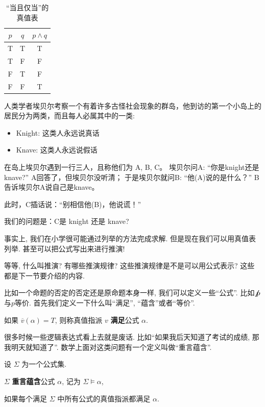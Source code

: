 \begin{table}
	\centering
	\begin{tabular}{|c|c|c|}
		\hline
		$p$ & $q$ & $p\land q$ \\ 
		\hline
		T & T & T\\ 
		T & F & F\\
		F & T & F\\ 
		F & F & T\\
		\hline
	\end{tabular}
	\caption{``当且仅当''的真值表}
	\label{tab:tru-iff}
\end{table}

\begin{prob}
	人类学者埃贝尔考察一个有着许多古怪社会现象的群岛，他到访的第一个小岛上的居民分为两类，而且每人必属其中的一类:
	\begin{itemize}
		\item Knight: 这类人永远说真话
		\item Knave: 这类人永远说假话
	\end{itemize}
	在岛上埃贝尔遇到一行三人，且称他们为 A, B, C。
埃贝尔问A: “你是knight还是knave?” A回答了，但埃贝尔没听清；
于是埃贝尔就问B: “他(A)说的是什么？” B告诉埃贝尔A说自己是knave。

此时，C插话说：“别相信他(B)，他说谎！”

我们的问题是：C是 knight 还是 knave?
\end{prob}

事实上, 我们在小学很可能通过列举的方法完成求解. 但是现在我们可以用真值表列举. 甚至可以把公式写出来进行推演! 

\begin{bonus}
	等等, 什么叫推演? 有哪些推演规律? 这些推演规律是不是可以用公式表示? 这些都是下一节要介绍的内容. 
\end{bonus}

比如一个命题的否定的否定还是原命题本身一样, 我们可以定义一些``公式''. 比如$\not \not p$与$p$等价. 首先我们定义一下什么叫``满足'', ``蕴含''或者``等价''. 

\begin{definition}[满足 (Satisfy)]
        如果 $\overline{v}(\alpha) = T$, 则称真值指派 $v$ {\bf 满足}公式 $\alpha$. 
      \end{definition}

      很多时候一些逻辑表达式看上去就是废话. 比如``如果我后天知道了考试的成绩, 那我明天就知道了''. 数学上面对这类问题有一个定义叫做``重言蕴含''. 

      \begin{definition}
          设 $\Sigma$ 为一个公式集. 
    
          $\Sigma$ {\bf 重言蕴含}公式 $\alpha$,
          记为 $\Sigma \models \alpha$,
    
          如果{每个}满足 $\Sigma$ 中{所有}公式的真值指派都满足 $\alpha$. 
      \end{definition}

